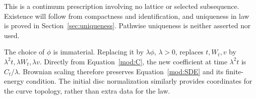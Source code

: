 This is a continuum prescription involving no lattice or selected
subsequence. Existence will follow from compactness and identification,
and uniqueness in law is proved in Section~\ref{sec:uniqueness}.
Pathwise uniqueness is neither asserted nor used.

\begin{remark}\label{mod:chart-independence}
The choice of $\phi$ is immaterial. Replacing it by $\lambda\phi$,
$\lambda>0$, replaces $t,W_t,v$ by
$\lambda^2t,\lambda W_t,\lambda v$. Directly from
Equation~\eqref{mod:C}, the new coefficient at time $\lambda^2t$
is $C_t/\lambda$. Brownian scaling therefore preserves
Equation~\eqref{mod:SDE} and its finite-energy condition. The initial
disc normalization similarly provides coordinates for the curve
topology, rather than extra data for the law.
\end{remark}
